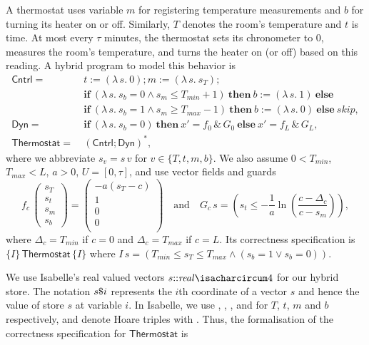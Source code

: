 \documentclass[envcountsame]{llncs}
\newcommand{\IF}[3]{\mathbf{if}\ #1\ \mathbf{then}\ #2\ \mathbf{else}\ #3}
\begin{document}
\begin{example}\label{ex:therm-sol}
A thermostat uses variable $m$ for registering temperature measurements and $b$ for turning its heater on or off. Similarly, $T$ denotes the room's temperature and $t$ is time. At most every $\tau$ minutes, the thermostat sets its chronometer to $0$, measures 
the room's temperature, and turns the heater on (or off) based on this reading. A hybrid program to model this behavior is
\begin{align*}
	\mathsf{Cntrl} = &\ {t:=(\lambda\, s.\ 0)};{m:=(\lambda\, s.\ s_T)};\\
				&\ \IF {(\lambda\, s.\ s_b=0 \land s_m\leq T_{min} + 1)} {b:=(\lambda\, s.\ 1)} {}\\
				&\ \IF {(\lambda\, s.\ s_b=1 \land s_m\geq T_{max} - 1)} {b:=(\lambda\, s.\ 0)} {\mathit{skip}},\\
	\mathsf{Dyn} = &\ \IF {(\lambda\, s.\ s_b=0)} {x' = f_0\, \&\, G_0} {x' = f_L\, \&\, G_L},\\
	\mathsf{Thermostat} = &\ (\mathsf{Cntrl}{;}\mathsf{Dyn})^\ast,
\end{align*}
where we abbreviate $s_v=s\, v$ for $v\in\{T,t,m,b\}$. We also assume $0<T_{min}$, $T_{max}<L$, $a>0$, $U=[0,\tau]$, and use vector fields and guards
 \begin{equation*}
    f_c\,
    \begin{pmatrix}
      s_T\\
      s_t\\
	s_m\\
	s_b
    \end{pmatrix}
=
\begin{pmatrix}
  -a(s_T-c)\\
  1\\
  0\\
  0\\
\end{pmatrix}\quad\text{and}\quad
G_c\, s = \left(s_t\leq -\frac{1}{a}\ln\left(\frac{c-\Delta_c}{c-s_m}\right)\right),
\end{equation*}
where $\Delta_c=T_{min}$ if $c=0$ and $\Delta_c = T_{max}$ if $c=L$. Its correctness specification is $\{I\}\, \mathsf{Thermostat}\, \{I\}$ where $I\, s=\left(T_{min}\leq s_T\leq T_{max}\land (s_b = 1 \lor s_b=0)\right)$.

We use Isabelle's real valued vectors $s{\isacharcolon}{\isacharcolon}\mathit{real}{\isacharcircum}4$ for our hybrid store. The notation $s{\emph{$\$$}}i$ represents the $i$th coordinate of a vector $s$ and
hence the value of store $s$ at variable $i$. In Isabelle, we use , , , and  for $T$, $t$, $m$ and $b$ respectively, and denote Hoare triples with . Thus, the formalisation of the correctness specification for $\mathsf{Thermostat}$ is


\end{example}
\end{document}
